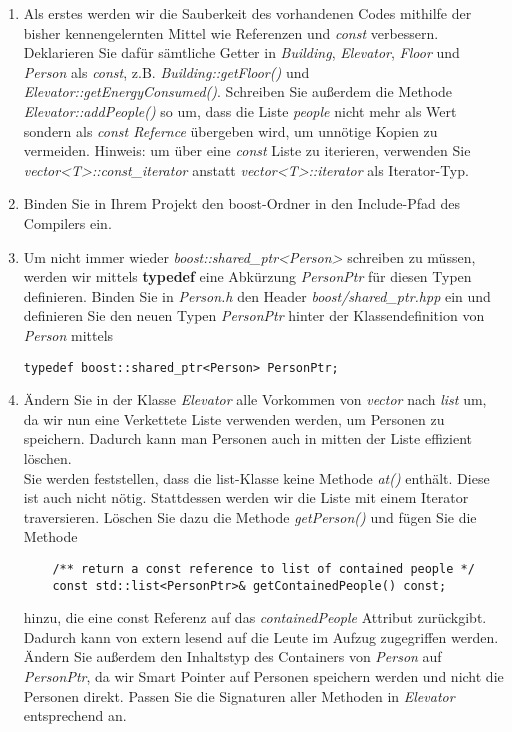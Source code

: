 \documentclass[
  accentcolor=tud1c,	%
  colorbacktitle,		%
  inverttitle,			%
  german,				%
  twoside
]{tudexercise}
\begin{document}
\begin{enumerate}
\item Als erstes werden wir die Sauberkeit des vorhandenen Codes mithilfe der bisher kennengelernten Mittel wie Referenzen und \emph{const} verbessern. Deklarieren Sie dafür sämtliche Getter in \emph{Building}, \emph{Elevator}, \emph{Floor} und \emph{Person}
als \emph{const}, z.B. \emph{Building::getFloor()} und \emph{Elevator::getEnergyConsumed()}. Schreiben Sie außerdem die Methode \emph{Elevator::addPeople()} so um, dass die Liste \emph{people} nicht mehr als Wert sondern als \emph{const Refernce} übergeben wird, um unnötige Kopien zu vermeiden. Hinweis: um über eine \emph{const} Liste zu iterieren, verwenden Sie \emph{vector<T>::const\_iterator} anstatt \emph{vector<T>::iterator} als Iterator-Typ.

\item Binden Sie in Ihrem Projekt den boost-Ordner in den Include-Pfad des Compilers ein.

\item Um nicht immer wieder \emph{boost::shared\_ptr<Person>} schreiben zu müssen, werden wir mittels \textbf{typedef} eine Abkürzung \emph{PersonPtr} für diesen Typen definieren. Binden Sie in \emph{Person.h} den Header \emph{boost/shared\_ptr.hpp} ein und definieren Sie den neuen Typen \emph{PersonPtr} hinter der Klassendefinition von \emph{Person} mittels

\begin{lstlisting}
typedef boost::shared_ptr<Person> PersonPtr;
\end{lstlisting}

\item Ändern Sie in der Klasse \emph{Elevator} alle Vorkommen von \emph{vector} nach \emph{list} um, da wir nun eine Verkettete Liste verwenden werden, um Personen zu speichern. Dadurch kann man Personen auch in mitten der Liste effizient löschen. \\
Sie werden feststellen, dass die list-Klasse keine Methode \emph{at()} enthält. Diese ist auch nicht nötig. Stattdessen werden wir die Liste mit einem Iterator traversieren. Löschen Sie dazu die Methode \emph{getPerson()} und fügen Sie die Methode  

\begin{lstlisting}
	/** return a const reference to list of contained people */
	const std::list<PersonPtr>& getContainedPeople() const;
\end{lstlisting}

hinzu, die eine const Referenz auf das \emph{containedPeople} Attribut zurückgibt. Dadurch kann von extern lesend auf die Leute im Aufzug zugegriffen werden. Ändern Sie außerdem den Inhaltstyp des Containers von \emph{Person} auf \emph{PersonPtr}, da wir Smart Pointer auf Personen speichern werden und nicht die Personen direkt. Passen Sie die Signaturen aller Methoden in \emph{Elevator} entsprechend an. \\


\end{enumerate}
\end{document}
